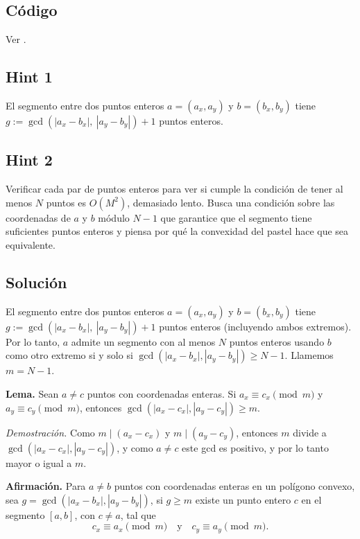\subsection*{Código}
Ver .


\subsection*{Hint 1}
El segmento entre dos puntos enteros $a=(a_x,a_y)$ y
$b=(b_x,b_y)$ tiene $g := \gcd(|a_x-b_x|,\ |a_y-b_y|) + 1$ puntos enteros.
\subsection*{Hint 2}
Verificar cada par de puntos enteros para ver si cumple la condición de tener al menos $N$ puntos es $O(M^2)$, demasiado lento. Busca una condición sobre las coordenadas de $a$ y $b$ módulo $N-1$ que garantice que el segmento tiene suficientes puntos enteros y piensa por qué la convexidad  del pastel hace que sea equivalente.
\subsection*{Solución}
El segmento entre dos puntos enteros $a=(a_x,a_y)$ y
$b=(b_x,b_y)$ tiene $g := \gcd(|a_x-b_x|,\ |a_y-b_y|) + 1$ puntos enteros (incluyendo ambos extremos). Por lo tanto, $a$ admite un segmento con al menos $N$ puntos enteros usando $b$ como otro extremo si y solo si $\gcd(|a_x-b_x|,|a_y-b_y|) \geq N-1$. Llamemos $m = N-1$.

\textbf{Lema.} Sean $a \neq c$ puntos con coordenadas enteras. Si $a_x \equiv c_x \pmod{m}$ y $a_y \equiv c_y \pmod{m}$, entonces $\gcd(|a_x-c_x|,|a_y-c_y|) \geq m$.

\emph{Demostración.} Como $m \mid (a_x-c_x)$ y $m \mid (a_y-c_y)$, entonces $m$ divide a $\gcd(|a_x-c_x|,|a_y-c_y|)$, y como $a \neq c$ este gcd es positivo, y por lo tanto mayor o igual a $m$.

\begin{samepage}
\textbf{Afirmación.} Para $a \neq b$ puntos con coordenadas enteras en un polígono convexo, sea $g = \gcd(|a_x - b_x|, |a_y - b_y|)$, si $g \geq m$ existe un punto entero $c$ en el segmento $[a,b]$, con $c \neq a$, tal que
\[
c_x \equiv a_x \pmod{m} \quad \text{y} \quad c_y \equiv a_y \pmod{m}.
\]

\end{samepage}

